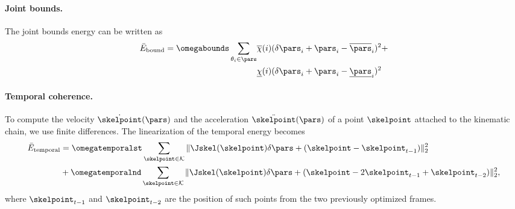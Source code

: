 \paragraph*{Joint bounds.} 
The joint bounds energy can be written as
%
\begin{align*}
\bar{E}_{\text{bound}} = \omegabounds \sum_{\theta_i \in \pars} &\overline{\chi}(i)(\delta\pars_i + \pars_i - \overline{\pars}_i)^2 + \nonumber \\
 &\underline{\chi}(i)(\delta\pars_i + \pars_i - \underline{\pars}_i)^2
\end{align*}
% 

% 
%  
% 
%
\paragraph*{Temporal coherence.} To compute the velocity $\dot \skelpoint(\pars)$ and the acceleration $\ddot \skelpoint(\pars)$ of a point $\skelpoint$ attached to the kinematic chain, we use finite differences. The linearization of the temporal energy becomes
% 
\begin{align*}
\bar{E}_{\text{temporal}} &= \omegatemporalst \sum_{\skelpoint \in \mathcal{K}} \|\Jskel(\skelpoint)\delta\pars + (\skelpoint - \skelpoint_{t-1})\|_2^2 \\
&+\omegatemporalnd \sum_{\skelpoint \in \mathcal{K}} \|\Jskel(\skelpoint)\delta\pars + (\skelpoint - 2\skelpoint_{t-1} + \skelpoint_{t-2})\|_2^2,
\end{align*}
where $\skelpoint_{t-1}$ and $\skelpoint_{t-2}$ are the position of such points from the two previously optimized frames.
% 
% 
%  
% 
%  
